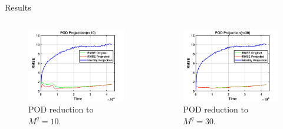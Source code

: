 \documentclass[aspectratio=169]{beamer}
\begin{document}
\begin{frame}{Results}
\begin{columns}
    \begin{column}{.49\textwidth}
\begin{figure}[H]
\centering
\includegraphics[width=\textwidth]{figures/l96_pod10.png}
\caption{POD reduction to $M^q=10$.}
\end{figure}
    \end{column}

 \begin{column}{.49\textwidth}
\begin{figure}[H]
\centering
\includegraphics[width=\textwidth]{figures/l96_pod30.png}
\caption{POD reduction to $M^q=30$.}
\end{figure}
 \end{column}
\end{columns}
\end{frame}
\end{document}
